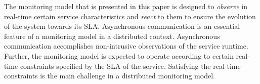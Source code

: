 The monitoring model that is presented in this paper is designed to \emph{observe} 
in real-time certain  service characteristics and \emph{react} to them to ensure the evolution of the system towards its SLA.
Asynchronous communication is an essential feature of a monitoring model 
in a distributed context.
Asynchronous communication accomplishes non-intrusive observations of the service runtime. 
Further, the monitoring model is expected to operate according to certain real-time constraints specified by the SLA of the service.
Satisfying the real-time constraints is the main challenge in a distributed monitoring model.



